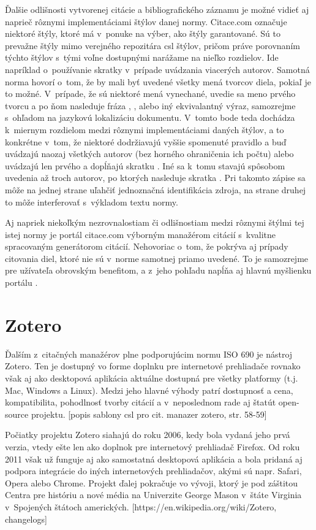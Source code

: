 \documentclass{fithesis3}
\begin{document}
	Ďalšie odlišnosti vytvorenej citácie a bibliografického záznamu je možné vidieť aj naprieč rôznymi implementáciami štýlov danej normy. Citace.com označuje niektoré štýly, ktoré má v~ponuke na výber, ako štýly garantované. Sú to prevažne štýly mimo verejného repozitára csl štýlov, pričom práve porovnaním týchto štýlov s~tými voľne dostupnými narážame na nieľko rozdielov. Ide napríklad o~používanie skratky  v~prípade uvádzania viacerých autorov. Samotná norma hovorí o~tom, že by mali byť uvedené všetky mená tvorcov diela, pokiaľ je to možné. V~prípade, že sú niektoré mená vynechané, uvedie sa meno prvého tvorcu a po ňom nasleduje fráza , ,  alebo iný ekvivalantný výraz, samozrejme s~ohľadom na jazykovú lokalizáciu dokumentu. V~tomto bode teda dochádza k~miernym rozdielom medzi rôznymi implementáciami daných štýlov, a to konkrétne v~tom, že niektoré dodržiavajú vyššie spomenuté pravidlo a buď uvádzajú naozaj všetkých autorov (bez horného ohraničenia ich počtu) alebo uvádzajú len prvého a dopĺňajú skratku . Iné sa k~tomu stavajú spôsobom uvedenia až troch autorov, po ktorých nasleduje skratka . Pri takomto zápise sa môže na jednej strane uľahčiť jednoznačná identifikácia zdroja, na strane druhej to môže interferovať s~výkladom textu normy.
	
	Aj napriek niekoľkým nezrovnalostiam či odlišnostiam medzi rôznymi štýlmi tej istej normy je portál citace.com výborným manažérom citácií s~kvalitne spracovaným generátorom citácií. Nehovoriac o~tom, že pokrýva aj prípady citovania diel, ktoré nie sú v~norme samotnej priamo uvedené. To je samozrejme pre užívateľa obrovským benefitom, a z~jeho pohľadu napĺňa aj hlavnú myšlienku portálu .
	
	\section{Zotero}
	Ďalším z~citačných manažérov plne podporujúcim normu ISO 690 je nástroj Zotero. Ten je dostupný vo forme doplnku pre internetové prehliadače rovnako však aj ako desktopová aplikácia aktuálne dostupná pre všetky platformy (t.j. Mac, Windows a Linux). Medzi jeho hlavné výhody patrí dostupnosť a cena, kompatibilita, pohodlnosť tvorby citácií a v~neposlednom rade aj štatút open-source projektu. [popis sablony csl pro cit. manazer zotero, str. 58-59]
	
	Počiatky projektu Zotero siahajú do roku 2006, kedy bola vydaná jeho prvá verzia, vtedy ešte len ako doplnok pre internetový prehliadač Firefox. Od roku 2011 však už funguje aj ako samostatná desktopová aplikácia a bola pridaná aj podpora integrácie do iných internetových prehliadačov, akými sú napr. Safari, Opera alebo Chrome. Projekt ďalej pokračuje vo vývoji, ktorý je pod záštitou Centra pre históriu a nové média na Univerzite George Mason v~štáte Virginia v~Spojených štátoch amerických. [https://en.wikipedia.org/wiki/Zotero, changelogs]
	
\end{document}
